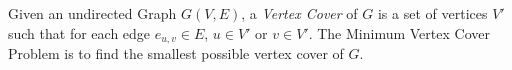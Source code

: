 \begin{defi}
\label{sub:mvc}

Given an undirected Graph $G(V,E)$, a {\em Vertex Cover} of $G$ is a set of vertices $V'$ such that for each edge $e_{u,v} \in E$, $u \in V'$ or $v \in V'$. The Minimum Vertex Cover Problem is to find the smallest possible vertex cover of $G$.

\end{defi}
